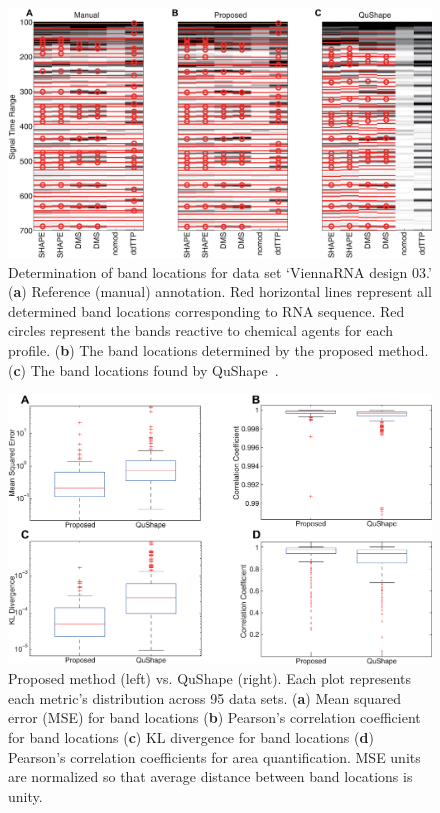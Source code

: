 \begin{figure}
\centering
\includegraphics[width=0.9\linewidth]{figures/result_band_assign6}
\caption{Determination of band locations for data set `ViennaRNA design 03.' (\textbf{a}) Reference (manual) annotation. Red horizontal lines represent all determined band locations corresponding to RNA sequence. Red circles represent the bands reactive to chemical agents for each profile. (\textbf{b}) The band locations determined by the proposed method. (\textbf{c}) The band locations found by QuShape~\citep{Karabiber2013}.}
\label{f:band-assign}
\end{figure}

\begin{figure}
\centering
\includegraphics[width=0.9\linewidth]{figures/boxplots}
\caption{Proposed method (left) vs. QuShape (right). Each plot represents each metric's distribution across 95 data sets. (\textbf{a}) Mean squared error (MSE) for band locations (\textbf{b}) Pearson's correlation coefficient for band locations (\textbf{c}) KL divergence for band locations (\textbf{d}) Pearson's correlation coefficients for area quantification. MSE units are normalized so that average distance between band locations is unity.}
\label{f:boxplots}
\end{figure}


